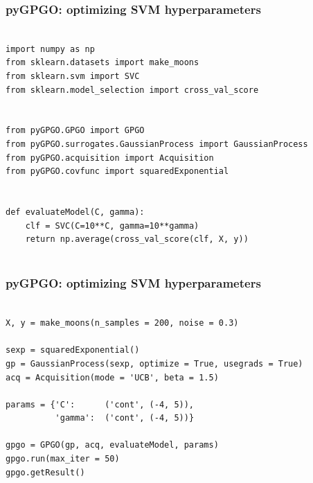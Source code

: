 \documentclass[10pt]{beamer}
\begin{document}
\begin{frame}[fragile]
\frametitle{pyGPGO: optimizing SVM hyperparameters}
\begin{verbatim}

import numpy as np
from sklearn.datasets import make_moons
from sklearn.svm import SVC
from sklearn.model_selection import cross_val_score


from pyGPGO.GPGO import GPGO
from pyGPGO.surrogates.GaussianProcess import GaussianProcess
from pyGPGO.acquisition import Acquisition
from pyGPGO.covfunc import squaredExponential


def evaluateModel(C, gamma):
    clf = SVC(C=10**C, gamma=10**gamma)
    return np.average(cross_val_score(clf, X, y))
               
\end{verbatim}
\end{frame}

\begin{frame}[fragile]
\frametitle{pyGPGO: optimizing SVM hyperparameters}
\begin{verbatim}
               
X, y = make_moons(n_samples = 200, noise = 0.3)
    
sexp = squaredExponential()
gp = GaussianProcess(sexp, optimize = True, usegrads = True)
acq = Acquisition(mode = 'UCB', beta = 1.5)

params = {'C':      ('cont', (-4, 5)),
          'gamma':  ('cont', (-4, 5))}

gpgo = GPGO(gp, acq, evaluateModel, params)
gpgo.run(max_iter = 50)
gpgo.getResult()
\end{verbatim}
\end{frame}
\end{document}
